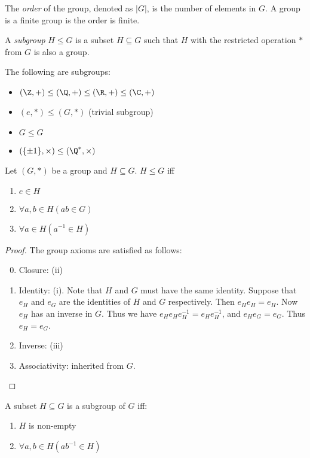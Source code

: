 \documentclass[a4paper]{article}
\begin{document}
  \begin{defi}
    The \emph{order} of the group, denoted as $|G|$, is the number of elements in $G$. A group is a finite group is the order is finite.
  \end{defi}
  \begin{defi}[Subgroup]
    A \emph{subgroup} $H\leq G$ is a subset $H\subseteq G$ such that $H$ with the restricted operation $*$ from $G$ is also a group.
  \end{defi}
  \begin{eg}
    The following are subgroups:
    \begin{itemize}
      \item $(\Z, +)\leq (\Q, +) \leq (\R, +)\leq (\C, +)$
      \item $({e}, *) \leq (G, *)$ (trivial subgroup)
      \item $G \leq G$
      \item $(\{\pm 1\}, \times) \leq (\Q^*, \times)$
    \end{itemize}
  \end{eg}
  \begin{lemma}
    Let $(G, *)$ be a group and $H\subseteq G$. $H \leq G$ iff
    \begin{enumerate}
      \item $e \in H$
      \item $\forall a, b\in H(ab \in G)$
      \item $\forall a \in H(a^{-1} \in H)$
    \end{enumerate}
  \end{lemma}
  \begin{proof}
    The group axioms are satisfied as follows:
    \begin{enumerate}[label=\arabic{*}.]
        \setcounter{enumi}{-1}
      \item Closure: (ii)
      \item Identity: (i). Note that $H$ and $G$ must have the same identity. Suppose that $e_H$ and $e_G$ are the identities of $H$ and $G$ respectively. Then $e_He_H = e_H$. Now $e_H$ has an inverse in $G$. Thus we have $e_He_He_H^{-1} = e_He_H^{-1}$, and $e_He_G = e_G$. Thus $e_H = e_G$.
      \item Inverse: (iii)
      \item Associativity: inherited from $G$.
    \end{enumerate}
  \end{proof}
  \begin{lemma}
    A subset $H\subseteq G$ is a subgroup of $G$ iff:
    \begin{enumerate}[label=(\Roman{*})]
      \item $H$ is non-empty
      \item $\forall a, b\in H(ab^{-1}\in H)$
    \end{enumerate}
  \end{lemma}
\end{document}
